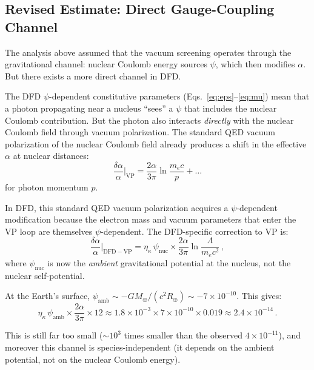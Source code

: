 \documentclass[aps,prd,twocolumn,superscriptaddress,nofootinbib]{revtex4-2}
\newcommand{\ee}[1]{\times 10^{#1}}
\newcommand{\kap}{\kappa}
\newcommand{\dalpha}{\delta\alpha}
\begin{document}
\subsection{Revised Estimate: Direct Gauge-Coupling Channel}
\label{sec:revised}

The analysis above assumed that the vacuum screening operates through
the gravitational channel: nuclear Coulomb energy sources $\psi$,
which then modifies $\alpha$.  But there exists a more direct
channel in DFD.

The DFD $\psi$-dependent constitutive parameters
(Eqs.~\ref{eq:eps}--\ref{eq:mu}) mean that a photon propagating
near a nucleus ``sees'' a $\psi$ that includes the nuclear Coulomb
contribution.  But the photon also interacts \emph{directly} with
the nuclear Coulomb field through vacuum polarization.  The standard
QED vacuum polarization of the nuclear Coulomb field already produces
a shift in the effective $\alpha$ at nuclear distances:
\begin{equation}
\frac{\dalpha}{\alpha}\bigg|_{\mathrm{VP}} =
\frac{2\alpha}{3\pi}\ln\frac{m_e c}{p} + \ldots
\end{equation}
for photon momentum $p$.

In DFD, this standard QED vacuum polarization acquires a
$\psi$-dependent modification because the electron mass and
vacuum parameters that enter the VP loop are themselves
$\psi$-dependent.  The DFD-specific correction to VP is:
\begin{equation}\label{eq:dfd-vp}
\frac{\dalpha}{\alpha}\bigg|_{\mathrm{DFD-VP}} =
\eta_\kap\,\psi_{\mathrm{nuc}} \times
\frac{2\alpha}{3\pi}\ln\frac{\Lambda}{m_e c^2}\,,
\end{equation}
where $\psi_{\mathrm{nuc}}$ is now the \emph{ambient} gravitational
potential at the nucleus, not the nuclear self-potential.

At the Earth's surface, $\psi_{\mathrm{amb}} \sim -GM_\oplus/(c^2 R_\oplus)
\sim -7\ee{-10}$.  This gives:
\begin{equation}
\eta_\kap\,\psi_{\mathrm{amb}} \times \frac{2\alpha}{3\pi}\times 12
\approx 1.8\ee{-3} \times 7\ee{-10} \times 0.019 \approx 2.4\ee{-14}\,.
\end{equation}

This is still far too small ($\sim\!10^3$ times smaller than the
observed $4\ee{-11}$), and moreover this channel is species-independent
(it depends on the ambient potential, not on the nuclear Coulomb energy).


\end{document}
